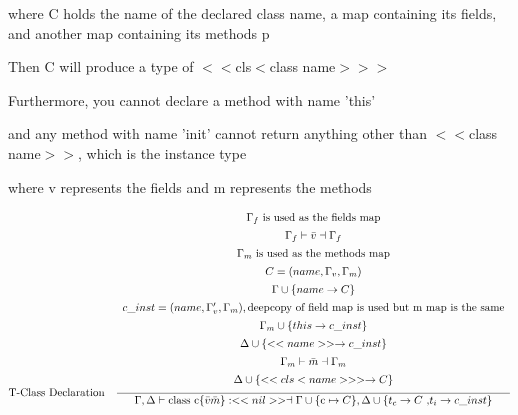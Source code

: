 \documentclass{article}
\begin{document}
{%

{\large where C holds the name of the declared class name, a map containing its fields, and another map containing its methods p\par}
{\large Then C will produce a type of $<<$cls$<$class name$>>>$\par}
{\large Furthermore, you cannot declare a method with name 'this'\par}
{\large and any method with name 'init' cannot return anything other than $<<$class name$>>$, which is the instance type\par}
{\large where v represents the fields and m represents the methods\par}

\[
\text{T-Class Declaration} \quad
\frac{
  \begin{array}{c}
    \Gamma_f \text{ is used as the fields map} \\[1ex]
    \Gamma_f \vdash \Bar{v} \dashv \Gamma_f \\[1ex]
    \Gamma_m \text{ is used as the methods map} \\[1ex]
    C = (name, \Gamma_v, \Gamma_m) \\[1ex]
    \Gamma \cup \{name \rightarrow C\} \\[1ex]
    c\_inst = (name, \Gamma_v', \Gamma_m), \text{deepcopy of field map is used but m map is the same}\\[1ex]
    \Gamma_m \cup \{this \rightarrow c\_inst\} \\[1ex]
    \Delta \cup \{<<name>> \rightarrow c\_inst\} \\[1ex]
    \Gamma_m \vdash \Bar{m} \dashv \Gamma_m \\[1ex]
    \Delta \cup \{<<cls<name>>> \rightarrow C\} \\[1ex]
  \end{array}
}{
  \Gamma , \Delta \vdash \text{class c\{}\Bar{v}\Bar{m}\text{\}} : <<nil>> \dashv \Gamma \cup \{\text{c} \mapsto C\}, \Delta \cup \{t_c \rightarrow C\ \text{,} t_i \rightarrow c\_inst\}
}
\]



}
\end{document}
